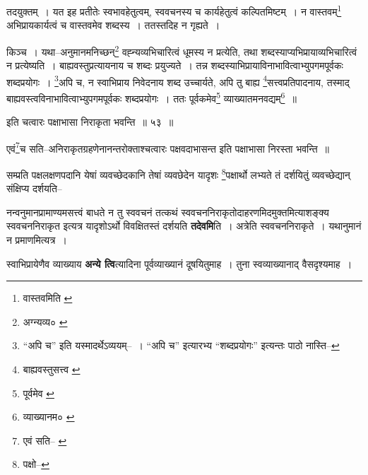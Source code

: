 \documentclass[article,12pt,a4paper]{memoir}
\begin{document}
	  \pstart तदयुक्तम् । यत इह प्रतीतेः स्वभावहेतुत्वम्, स्ववचनस्य च कार्यहेतुत्वं कल्पितमिष्टम् । न वास्तवम्\footnote{वास्तवमिति \cite{dp-msC} \cite{dp-msD}} अभिप्रायकार्यत्वं च वास्तवमेव शब्दस्य । ततस्तदिह न गृह्यते ।
	\pend
       

	  \pstart किञ्च । यथा--अनुमानमनिच्छन्\footnote{अग्न्यव्य० \cite{dp-msD}} वह्न्यव्यभिचारित्वं धूमस्य न प्रत्येति, तथा शब्दस्याप्यभिप्रायाव्यभिचारित्वं न प्रत्येष्यति । बाह्यवस्तुप्रत्यायनाय च शब्दः प्रयुज्यते । तन्न शब्दस्याभिप्रायाविनाभावित्वाभ्युपगमपूर्वकः शब्दप्रयोगः । \footnote{“अपि च” इति यस्मादर्थेऽव्ययम्--\cite{dp-msD-n} । “अपि च” इत्यारभ्य “शब्दप्रयोगः” इत्यन्तः पाठो नास्ति--\cite{dp-msB}}अपि च, न स्वाभिप्राय निवेदनाय शब्द उच्चार्यते, अपि तु बाह्य \footnote{बाह्यवस्तुसत्त्व \cite{dp-msA} \cite{dp-msB} \cite{dp-msC} \cite{dp-msD} \cite{dp-edP} \cite{dp-edH} \cite{dp-edE} \cite{dp-edN}}सत्त्वप्रतिपादनाय, तस्माद् बाह्यवस्त्वविनाभावित्वाभ्युपगमपूर्वकः शब्दप्रयोगः । ततः पूर्वकमेव\footnote{पूर्वमेव \cite{dp-edE}} व्याख्यातमनवद्यम्\footnote{व्याख्यानम० \cite{dp-msA} \cite{dp-msB} \cite{dp-msC} \cite{dp-msD} \cite{dp-edP} \cite{dp-edH} \cite{dp-edE} \cite{dp-edN}} ॥
	\pend
       
	  \bigskip
	  \begingroup
	

	  \pstart इति चत्वारः पक्षाभासा निराकृता भवन्ति ॥ ५३ ॥
	\pend
      
	  \endgroup
	 

	  \pstart एवं\footnote{एवं सति--\cite{dp-msA} \cite{dp-edP} \cite{dp-edN}}च सति--अनिराकृतग्रहणेनानन्तरोक्ताश्चत्वारः पक्षवदाभासन्त इति पक्षाभासा निरस्ता भवन्ति ॥
	\pend
       

	  \pstart सम्प्रति पक्षलक्षणपदानि येषां व्यवच्छेदकानि तेषां व्यवछेदेन यादृशः \footnote{पक्षो--\cite{dp-msC}}पक्षार्थो लभ्यते तं दर्शयितुं व्यवच्छेद्यान् संक्षिप्य दर्शयति--
	\pend
      
	  \endgroup
	

	  \pstart नन्वनुमानप्रामाण्यमसत्त्वं बाधते न तु स्ववचनं तत्कथं स्ववचननिराकृतोदाहरणमिदमुक्तमित्याशङ्क्य स्ववचननिराकृत इत्यत्र यादृशोऽर्थो विवक्षितस्तं दर्शयति \textbf{तदेवमि}ति । अत्रेति स्ववचननिराकृते । यथानुमानं न प्रमाणमित्यत्र ।
	\pend
      

	  \pstart स्वाभिप्रायेणैव व्याख्याय \textbf{अन्ये त्वि}त्यादिना पूर्वव्याख्यानं दूषयितुमाह । तुना स्वव्याख्यानाद् वैसदृश्यमाह ।
	\pend
      
\end{document}
